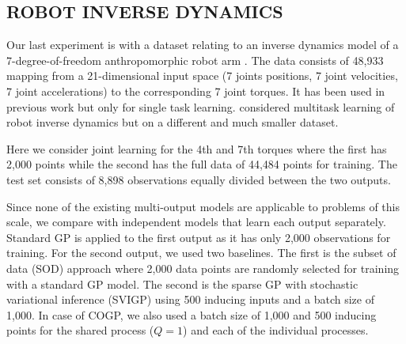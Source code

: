 \subsection{ROBOT INVERSE DYNAMICS}
Our last experiment is with a dataset relating to an inverse dynamics model of a 7-degree-of-freedom anthropomorphic robot arm \citep{vijayakumar2000locally}.
The data consists of 48,933 mapping from a 21-dimensional input space (7 joints positions, 7 joint velocities, 7 joint accelerations) to the corresponding 7 joint torques.
It has been used in previous work \citep[see e.g.][]{rasmussen-williams-book,vijayakumar2000locally} but only for single task learning. 
\citet{chai2008multi} considered multitask learning of robot inverse dynamics  but on a different and much smaller dataset.

Here we consider joint learning for the 4th and 7th torques where the first has 2,000 points  while the second has the full data of 44,484 points for training.
The test set consists of 8,898 observations equally divided between the two outputs.

Since none of the existing multi-output models are applicable to problems of this scale, we compare with independent models that learn each output separately.
Standard GP is applied to the first output as it has only 2,000 observations for training.
For the second output, we used two baselines.
The first is the subset of data (SOD) approach where 2,000 data points are randomly selected for training with a standard GP model.
The second is the sparse GP with stochastic variational inference (SVIGP) using 500 inducing inputs and a batch size of 1,000.
In case of COGP, we also used a batch size of 1,000 and 500 inducing points for the shared process ($Q = 1$) and each of the individual processes.

